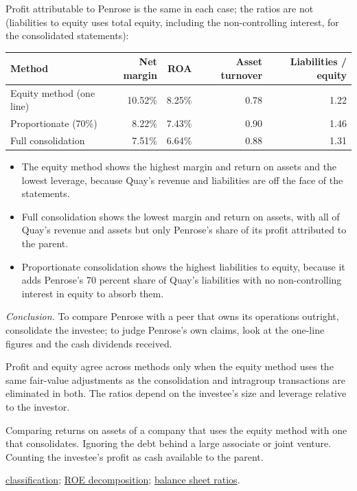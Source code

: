 \begin{qfmethod}
Profit attributable to Penrose is the same in each case; the ratios are not (liabilities to equity uses total equity, including the non-controlling interest, for the consolidated statements):
\begin{center}\small
\begin{tabular}{@{}lrrrr@{}}
\toprule
Method & Net margin & ROA & Asset turnover & Liabilities / equity \\
\midrule
Equity method (one line) & 10.52\% & 8.25\% & 0.78 & 1.22 \\
Proportionate (70\%) & 8.22\% & 7.43\% & 0.90 & 1.46 \\
Full consolidation & 7.51\% & 6.64\% & 0.88 & 1.31 \\
\bottomrule
\end{tabular}
\end{center}
\begin{itemize}
\item The equity method shows the highest margin and return on assets and the lowest leverage, because Quay's revenue and liabilities are off the face of the statements.
\item Full consolidation shows the lowest margin and return on assets, with all of Quay's revenue and assets but only Penrose's share of its profit attributed to the parent.
\item Proportionate consolidation shows the highest liabilities to equity, because it adds Penrose's 70 percent share of Quay's liabilities with no non-controlling interest in equity to absorb them.
\end{itemize}
\emph{Conclusion.} To compare Penrose with a peer that owns its operations outright, consolidate the investee; to judge Penrose's own claims, look at the one-line figures and the cash dividends received.

 Profit and equity agree across methods only when the equity method uses the same fair-value adjustments as the consolidation and intragroup transactions are eliminated in both. The ratios depend on the investee's size and leverage relative to the investor.

 Comparing returns on assets of a company that uses the equity method with one that consolidates. Ignoring the debt behind a large associate or joint venture. Counting the investee's profit as cash available to the parent.

 \hyperref[def:intercorporate-investment-classification]{classification}; \hyperref[meth:return-on-equity-decomposition]{ROE decomposition}; \hyperref[meth:balance-sheet-ratios]{balance sheet ratios}.

\end{qfmethod}

